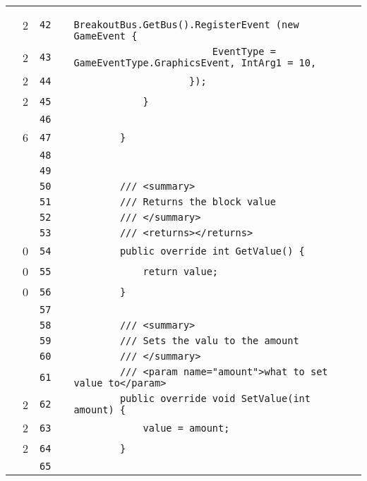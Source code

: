 \documentclass[a4paper,landscape,10pt]{article}
\begin{document}
\begin{longtable}[l]{lrrll}
\cellcolor{green} & 2 & \verb~42~ & & \verb~                BreakoutBus.GetBus().RegisterEvent (new GameEvent {~\\
\cellcolor{green} & 2 & \verb~43~ & & \verb~                        EventType = GameEventType.GraphicsEvent, IntArg1 = 10,~\\
\cellcolor{green} & 2 & \verb~44~ & & \verb~                    });~\\
\cellcolor{green} & 2 & \verb~45~ & & \verb~            }~\\
\cellcolor{gray} &  & \verb~46~ & & \verb~~\\
\cellcolor{green} & 6 & \verb~47~ & & \verb~        }~\\
\cellcolor{gray} &  & \verb~48~ & & \verb~~\\
\cellcolor{gray} &  & \verb~49~ & & \verb~~\\
\cellcolor{gray} &  & \verb~50~ & & \verb~        /// <summary>~\\
\cellcolor{gray} &  & \verb~51~ & & \verb~        /// Returns the block value~\\
\cellcolor{gray} &  & \verb~52~ & & \verb~        /// </summary>~\\
\cellcolor{gray} &  & \verb~53~ & & \verb~        /// <returns></returns>~\\
\cellcolor{red} & 0 & \verb~54~ & & \verb~        public override int GetValue() {~\\
\cellcolor{red} & 0 & \verb~55~ & & \verb~            return value;~\\
\cellcolor{red} & 0 & \verb~56~ & & \verb~        }~\\
\cellcolor{gray} &  & \verb~57~ & & \verb~~\\
\cellcolor{gray} &  & \verb~58~ & & \verb~        /// <summary>~\\
\cellcolor{gray} &  & \verb~59~ & & \verb~        /// Sets the valu to the amount~\\
\cellcolor{gray} &  & \verb~60~ & & \verb~        /// </summary>~\\
\cellcolor{gray} &  & \verb~61~ & & \verb~        /// <param name="amount">what to set value to</param>~\\
\cellcolor{green} & 2 & \verb~62~ & & \verb~        public override void SetValue(int amount) {~\\
\cellcolor{green} & 2 & \verb~63~ & & \verb~            value = amount;~\\
\cellcolor{green} & 2 & \verb~64~ & & \verb~        }~\\
\cellcolor{gray} &  & \verb~65~ & & \verb~~\\

\end{longtable}
\end{document}
